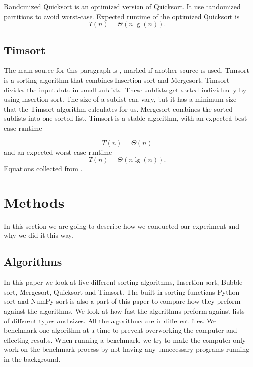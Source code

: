 \documentclass[sigconf, nonacm, natbib, screen, balance=False]{acmart}
\begin{document}
Randomized Quicksort is an optimized version of Quicksort. It use randomized partitions to avoid worst-case. Expected runtime of the optimized Quicksort is 
\begin{equation*}
T(n) = \Theta(n\lg(n)).
\end{equation*} 
\citet{CLRS_2009}

\subsection{Timsort }\label{sec:algo5}

The main source for this paragraph is \citet{kumar_2020}, marked if another source is used. Timsort is a sorting algorithm that combines Insertion sort and Mergesort. Timsort divides the input data in small sublists. These sublists get sorted individually by using Insertion sort. The size of a sublist can vary, but it has a minimum size that the Timsort algorithm calculates for us. Mergesort combines the sorted sublists into one sorted list. Timsort is a stable algorithm, with an expected best-case runtime 

\begin{equation*}
T(n) = \Theta(n) 
\end{equation*}
and an expected worst-case runtime
\begin{equation*}
T(n) = \Theta(n\lg(n)).
\end{equation*}
Equations collected from \citet{tim-sort}.

\section{Methods}\label{sec:methods}
In this section we are going to describe how we conducted our experiment and why we did it this way.
\subsection{Algorithms}

In this paper we look at five different sorting algorithms, Insertion sort, Bubble sort, Mergesort, Quicksort and Timsort. The built-in sorting functions Python sort and NumPy sort is also a part of this paper to compare how they preform against the algorithms. We look at how fast the algorithms preform against lists of different types and sizes. All the algorithms are in different files. We benchmark one algorithm at a time to prevent overworking the computer and effecting results. When running a benchmark, we try to make the computer only work on the benchmark process by not having any unnecessary programs running in the background.
\end{document}
